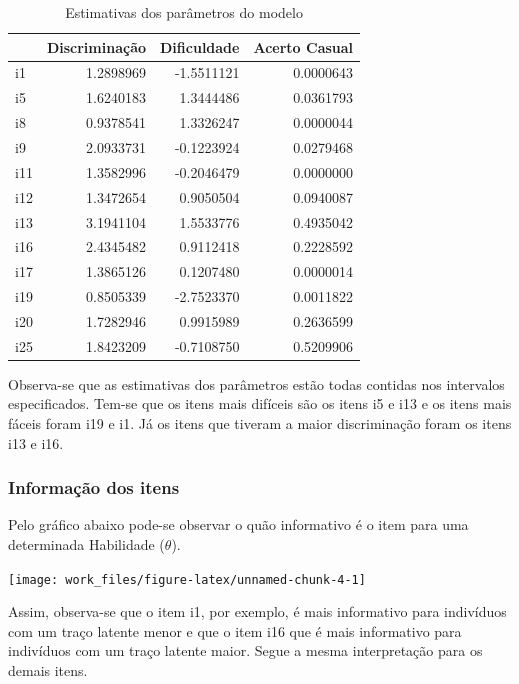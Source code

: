 \documentclass[]{article}
\begin{document}
\begin{table}[!h]

\caption{\label{tab:tabest}Estimativas dos parâmetros do modelo}
\centering
\begin{tabular}[t]{lrrr}
\toprule
  & Discriminação & Dificuldade & Acerto Casual\\
\midrule
i1 & 1.2898969 & -1.5511121 & 0.0000643\\
i5 & 1.6240183 & 1.3444486 & 0.0361793\\
i8 & 0.9378541 & 1.3326247 & 0.0000044\\
i9 & 2.0933731 & -0.1223924 & 0.0279468\\
i11 & 1.3582996 & -0.2046479 & 0.0000000\\
\addlinespace
i12 & 1.3472654 & 0.9050504 & 0.0940087\\
i13 & 3.1941104 & 1.5533776 & 0.4935042\\
i16 & 2.4345482 & 0.9112418 & 0.2228592\\
i17 & 1.3865126 & 0.1207480 & 0.0000014\\
i19 & 0.8505339 & -2.7523370 & 0.0011822\\
\addlinespace
i20 & 1.7282946 & 0.9915989 & 0.2636599\\
i25 & 1.8423209 & -0.7108750 & 0.5209906\\
\bottomrule
\end{tabular}
\end{table}

Observa-se que as estimativas dos parâmetros estão todas contidas nos
intervalos especificados. Tem-se que os itens mais difíceis são os itens
i5 e i13 e os itens mais fáceis foram i19 e i1. Já os itens que tiveram
a maior discriminação foram os itens i13 e i16.

\subsubsection{Informação dos itens}\label{informacao-dos-itens}

Pelo gráfico abaixo pode-se observar o quão informativo é o item para
uma determinada Habilidade (\(\theta\)).

\begin{center}\texttt{[image: work\_files/figure-latex/unnamed-chunk-4-1]} \end{center}

Assim, observa-se que o item i1, por exemplo, é mais informativo para
indivíduos com um traço latente menor e que o item i16 que é mais
informativo para indivíduos com um traço latente maior. Segue a mesma
interpretação para os demais itens.
\end{document}
